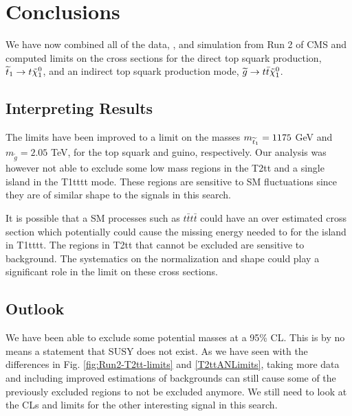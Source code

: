\chapter{Conclusions}
\label{ch:Conclusions}

We have now combined all of the data, \datalumi{}, and simulation from Run 2 of CMS and computed limits on the cross sections for the direct top squark production, $\widetilde{t}_1\rightarrow t\tilde{\chi}^{0}_{1}$, and an indirect top squark production mode, $\widetilde{g}\rightarrow t \bar{t}\tilde{\chi}^{0}_{1}$. 

\section{Interpreting Results}
\label{sec:Interp}

The limits have been improved to a limit on the masses $m_{\widetilde{t}_1}=1175$ GeV and $m_{\widetilde{g}}=2.05$ TeV, for the top squark and guino, respectively. Our analysis was however not able to exclude some low mass regions in the T2tt and a single island in the T1tttt mode. These regions are sensitive to SM fluctuations since they are of similar shape to the signals in this search. 

It is possible that a SM processes such as $t\bar{t}t\bar{t}$ could have an over estimated cross section which potentially could cause the missing energy needed to for the island in T1tttt. The regions in T2tt that cannot be excluded are sensitive to \Znunu{} background. The \Znunu{} systematics on the normalization and shape could play a significant role in the limit on these cross sections. 

\section{Outlook}
\label{sec:outlook}

We have been able to exclude some potential masses at a 95\% CL. This is by no means a statement that SUSY does not exist. As we have seen with the differences in Fig. \ref{fig:Run2-T2tt-limits} and \ref{T2ttANLimits}, taking more data and including improved estimations of backgrounds can still cause some of the previously excluded regions to not be excluded anymore. We still need to look at the CLs and limits for the other interesting signal in this search. 
